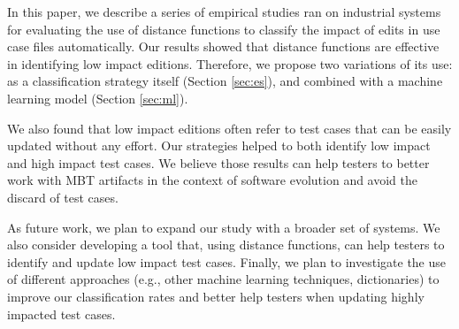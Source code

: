 In this paper, we describe a series of empirical studies ran on industrial systems for evaluating the use of distance functions %
to classify the impact of edits in use case files automatically. Our results showed that distance functions are effective in identifying low impact editions. Therefore, we propose two variations of its use: as a classification strategy itself (Section \ref{sec:es}), and combined with a machine learning model (Section \ref{sec:ml}).

We also found that low impact editions often refer to test cases that can be easily updated without any effort. Our strategies helped to both identify low impact and high impact test cases. We believe those results can help testers to better work with MBT artifacts in the context of software evolution and avoid the discard of test cases.

As future work, we plan to expand our study with a broader set of systems. We also consider developing a tool that, using distance functions, can help testers to identify and update low impact test cases. Finally, we plan to investigate the use of different approaches (e.g., other machine learning techniques, dictionaries) to improve our classification rates and better help testers when updating highly impacted test cases.